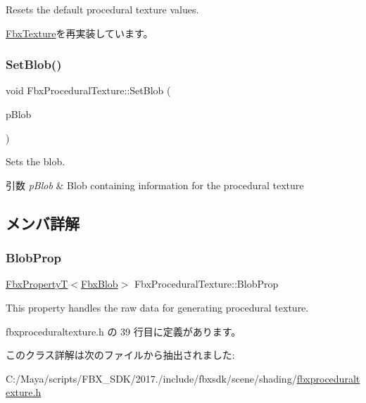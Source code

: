 Resets the default procedural texture values. 

\hyperlink{class_fbx_texture_a9ba254e02e13f1cae91295c996ed7fcb}{Fbx\+Texture}を再実装しています。

\mbox{\label{class_fbx_procedural_texture_a474dd437337ac1f76e7b9c77b7af45ee}} 
\subsubsection{\texorpdfstring{Set\+Blob()}{SetBlob()}}
{\footnotesize\ttfamily void Fbx\+Procedural\+Texture\+::\+Set\+Blob (\begin{DoxyParamCaption}\item[{\hyperlink{class_fbx_blob}{Fbx\+Blob} \&}]{p\+Blob }\end{DoxyParamCaption})}

Sets the blob. 
\begin{DoxyParams}{引数}
{\em p\+Blob} & Blob containing information for the procedural texture \\
\hline
\end{DoxyParams}


\subsection{メンバ詳解}
\mbox{\label{class_fbx_procedural_texture_aaf3a45d4b05897639d7c6a8e9d8a1b69}} 
\subsubsection{\texorpdfstring{Blob\+Prop}{BlobProp}}
{\footnotesize\ttfamily \hyperlink{class_fbx_property_t}{Fbx\+PropertyT}$<$\hyperlink{class_fbx_blob}{Fbx\+Blob}$>$ Fbx\+Procedural\+Texture\+::\+Blob\+Prop}

This property handles the raw data for generating procedural texture. 

 fbxproceduraltexture.\+h の 39 行目に定義があります。



このクラス詳解は次のファイルから抽出されました\+:\begin{DoxyCompactItemize}
\item 
C\+:/\+Maya/scripts/\+F\+B\+X\+\_\+\+S\+D\+K/2017./include/fbxsdk/scene/shading/\hyperlink{fbxproceduraltexture_8h}{fbxproceduraltexture.\+h}\end{DoxyCompactItemize}
